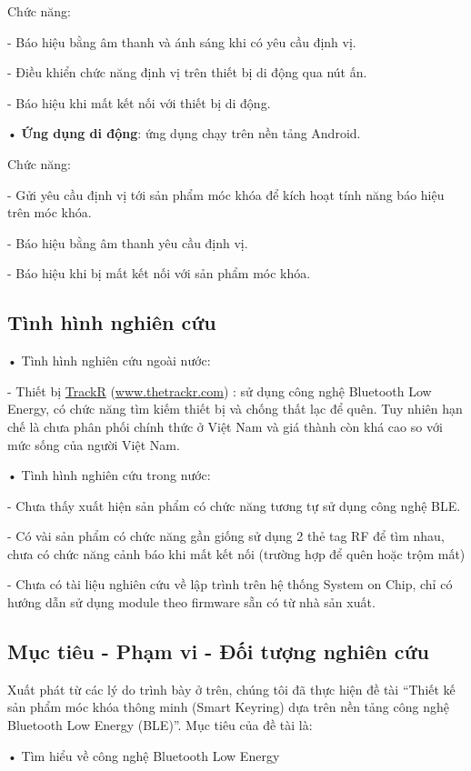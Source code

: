 Chức năng:

- Báo hiệu bằng âm thanh và ánh sáng khi có yêu cầu định vị.

- Điều khiển chức năng định vị trên thiết bị di động qua nút ấn.
	
- Báo hiệu khi mất kết nối với thiết bị di động.
		

• \textbf{Ứng dụng di động}: ứng dụng chạy trên nền tảng Android. 

Chức năng:

- Gửi yêu cầu định vị tới sản phẩm móc khóa để kích hoạt tính năng báo hiệu trên móc khóa.

- Báo hiệu bằng âm thanh yêu cầu định vị.

- Báo hiệu khi bị mất kết nối với sản phẩm móc khóa.

\subsection{Tình hình nghiên cứu}

• Tình hình nghiên cứu ngoài nước:

- Thiết bị \href{www.thetrackr.com}{TrackR} 
(\url{www.thetrackr.com}) : sử dụng công nghệ Bluetooth Low Energy, có chức năng tìm kiếm thiết bị và chống thất lạc để quên. Tuy nhiên hạn chế là chưa phân phối chính thức ở Việt Nam và giá thành còn khá cao so với mức sống của người Việt Nam.

• Tình hình nghiên cứu trong nước:

- Chưa thấy xuất hiện sản phẩm có chức năng tương tự sử dụng công nghệ BLE.

- Có vài sản phẩm có chức năng gần giống sử dụng 2 thẻ tag RF để tìm nhau, chưa có chức năng cảnh báo khi mất kết nối (trường hợp để quên hoặc trộm mất)

- Chưa có tài liệu nghiên cứu về lập trình trên hệ thống System on Chip, chỉ có hướng dẫn sử dụng module theo firmware sẵn có từ nhà sản xuất.

\subsection{Mục tiêu - Phạm vi - Đối tượng nghiên cứu}

Xuất phát từ các lý do trình bày ở trên, chúng tôi đã thực hiện đề tài “Thiết kế sản phẩm móc khóa thông minh (Smart Keyring) dựa trên nền tảng công nghệ Bluetooth Low Energy (BLE)”. Mục tiêu của đề tài là:

• Tìm hiểu về công nghệ Bluetooth Low Energy

